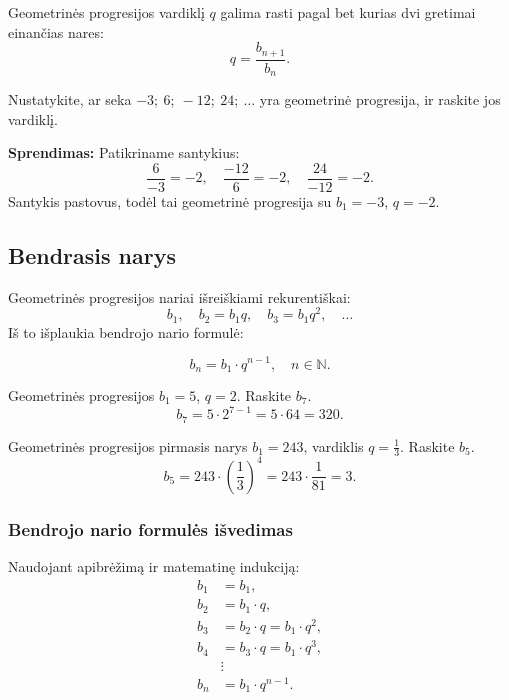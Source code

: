 \begin{remark}
Geometrinės progresijos vardiklį $q$ galima rasti pagal bet kurias dvi gretimai einančias nares:
\[
    q = \frac{b_{n+1}}{b_n}.
\]
\end{remark}

\begin{exercise}
Nustatykite, ar seka $-3;\ 6;\ -12;\ 24;\ \ldots$ yra geometrinė progresija, ir raskite jos vardiklį.

\textbf{Sprendimas:} Patikriname santykius:
\[
\frac{6}{-3} = -2, \quad \frac{-12}{6} = -2, \quad \frac{24}{-12} = -2.
\]
Santykis pastovus, todėl tai geometrinė progresija su $b_1 = -3$, $q = -2$.
\end{exercise}

\subsection{Bendrasis narys}

Geometrinės progresijos nariai išreiškiami rekurentiškai:
\[
    b_1,\quad b_2 = b_1 q,\quad b_3 = b_1 q^2,\quad \ldots
\]
Iš to išplaukia bendrojo nario formulė:

\begin{tcolorbox}[colback=blue!5!white, colframe=blue!60!black, title=Bendrojo nario formulė]
\[
    b_n = b_1 \cdot q^{n-1}, \quad n \in \mathbb{N}.
\]
\end{tcolorbox}

\begin{example}
Geometrinės progresijos $b_1 = 5$, $q = 2$. Raskite $b_7$.
\[
    b_7 = 5 \cdot 2^{7-1} = 5 \cdot 64 = 320.
\]
\end{example}

\begin{example}
Geometrinės progresijos pirmasis narys $b_1 = 243$, vardiklis $q = \tfrac{1}{3}$. Raskite $b_5$.
\[
    b_5 = 243 \cdot \left(\frac{1}{3}\right)^{4} = 243 \cdot \frac{1}{81} = 3.
\]
\end{example}

\subsubsection*{Bendrojo nario formulės išvedimas}

Naudojant apibrėžimą ir matematinę indukciją:
\begin{align*}
    b_1 &= b_1, \\
    b_2 &= b_1 \cdot q, \\
    b_3 &= b_2 \cdot q = b_1 \cdot q^2, \\
    b_4 &= b_3 \cdot q = b_1 \cdot q^3, \\
    &\vdots \\
    b_n &= b_1 \cdot q^{n-1}.
\end{align*}

